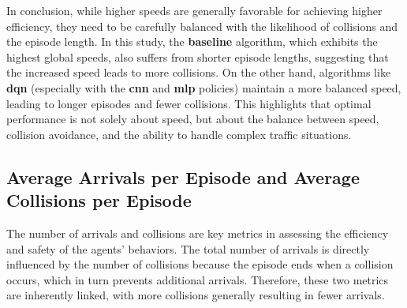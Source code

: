 In conclusion, while higher speeds are generally favorable for achieving higher efficiency, they need to be carefully balanced with the likelihood of collisions and the episode length. In this study, the \textbf{baseline} algorithm, which exhibits the highest global speeds, also suffers from shorter episode lengths, suggesting that the increased speed leads to more collisions. On the other hand, algorithms like \textbf{dqn} (especially with the \textbf{cnn} and \textbf{mlp} policies) maintain a more balanced speed, leading to longer episodes and fewer collisions. This highlights that optimal performance is not solely about speed, but about the balance between speed, collision avoidance, and the ability to handle complex traffic situations.

\subsection{Average Arrivals per Episode and Average Collisions per Episode}

The number of arrivals and collisions are key metrics in assessing the efficiency and safety of the agents' behaviors. The total number of arrivals is directly influenced by the number of collisions because the episode ends when a collision occurs, which in turn prevents additional arrivals. Therefore, these two metrics are inherently linked, with more collisions generally resulting in fewer arrivals.


